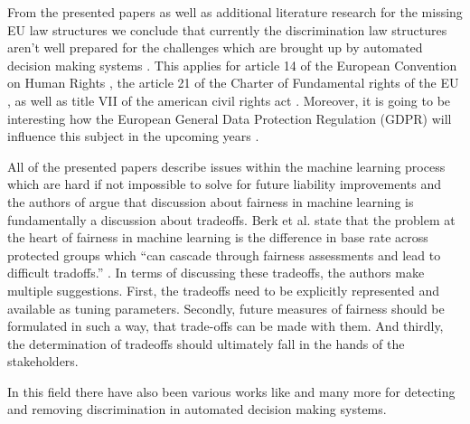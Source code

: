 From the presented papers as well as additional literature research for the missing EU law structures we conclude that currently the discrimination law structures aren't well prepared for the challenges which are brought up by automated decision making systems \cite{Barocas.2016, barocas-hardt-narayanan, automatedDsicrimination}. This applies for article 14 of the European Convention on Human Rights \cite{EU14}, the article 21 of the Charter of Fundamental rights of the EU \cite{EU21}, as well as title VII \cite{titleVII} of the american civil rights act  \cite{Barocas.2016, automatedDsicrimination}. Moreover, it is going to be interesting how the European General Data Protection Regulation (GDPR) will influence this subject in the upcoming years \cite{automatedDsicrimination, Singh}.

All of the presented papers describe issues within the machine learning process which are hard if not impossible to solve for future liability improvements and the authors of \cite{ Barocas.2016, Berk.2018} argue that discussion about fairness in machine learning is fundamentally a discussion about tradeoffs. Berk et al. state that the problem at the heart of fairness in machine learning is the difference
in base rate across protected groups which \enquote{can cascade through fairness assessments
and lead to difficult tradoffs.} \cite{Berk.2018}. In terms of discussing these tradeoffs, the authors make multiple suggestions. First, the tradeoffs need to be explicitly represented and available as tuning parameters. Secondly, future measures of fairness should be formulated in such a way, that trade-offs can be made with them. And thirdly, the determination of tradeoffs should ultimately fall in the hands of the stakeholders.

In this field there have also been various works like \cite{DBLP:conf/kdd/FeldmanFMSV15, isabel02, isabel01} and many more for detecting and removing discrimination in automated decision making systems. 